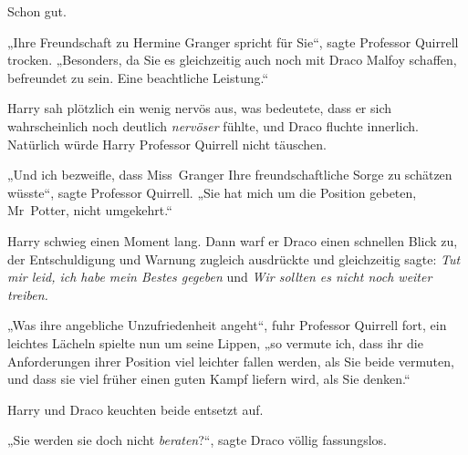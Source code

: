 Schon gut.

„Ihre Freundschaft zu Hermine Granger spricht für Sie“, sagte Professor Quirrell trocken.
„Besonders, da Sie es gleichzeitig auch noch mit Draco Malfoy schaffen, befreundet zu sein. Eine beachtliche Leistung.“

Harry sah plötzlich ein wenig nervös aus, was bedeutete, dass er sich wahrscheinlich noch deutlich \emph{nervöser} fühlte, und Draco fluchte innerlich. Natürlich würde Harry Professor Quirrell nicht täuschen.

„Und ich bezweifle, dass Miss~Granger Ihre freundschaftliche Sorge zu schätzen wüsste“, sagte Professor Quirrell.
„Sie hat mich um die Position gebeten, Mr~Potter, nicht umgekehrt.“

Harry schwieg einen Moment lang. Dann warf er Draco einen schnellen Blick zu, der Entschuldigung und Warnung zugleich ausdrückte und gleichzeitig sagte: \emph{Tut mir leid, ich habe mein Bestes gegeben} und \emph{Wir sollten es nicht noch weiter treiben.}

„Was ihre angebliche Unzufriedenheit angeht“, fuhr Professor Quirrell fort, ein leichtes Lächeln spielte nun um seine Lippen, „so vermute ich, dass ihr die Anforderungen ihrer Position viel leichter fallen werden, als Sie beide vermuten, und dass sie viel früher einen guten Kampf liefern wird, als Sie denken.“

Harry und Draco keuchten beide entsetzt auf.

„Sie werden sie doch nicht \emph{beraten}?“, sagte Draco völlig fassungslos.

